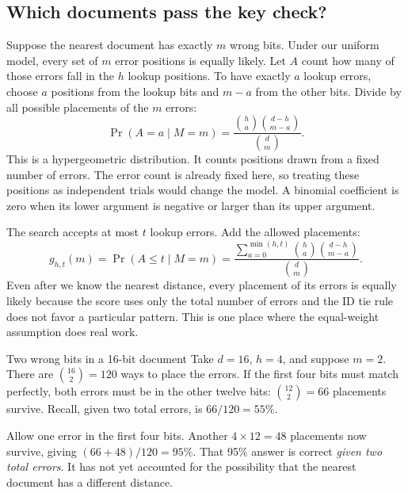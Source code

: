 
\subsection{Which documents pass the key check?}
Suppose the nearest document has exactly $m$ wrong bits. Under our uniform model, every set of
$m$ error positions is equally likely. Let $A$ count how many of those errors fall in the $h$
lookup positions. To have exactly $a$ lookup errors, choose $a$ positions from the lookup bits
and $m-a$ from the other bits. Divide by all possible placements of the $m$ errors:
\begin{equation}
\Pr(A=a\mid M=m)=
\frac{\binom{h}{a}\binom{d-h}{m-a}}{\binom{d}{m}}.
\label{eq:prefix-error-placements}
\end{equation}
This is a hypergeometric distribution. It counts positions drawn from a fixed number of errors.
The error count is already fixed here, so treating these positions as independent trials
would change the model. A binomial coefficient is zero when its lower argument is negative or
larger than its upper argument.

The search accepts at most $t$ lookup errors. Add the allowed placements:
\begin{equation}
g_{h,t}(m)=\Pr(A\le t\mid M=m)
=\frac{\displaystyle\sum_{a=0}^{\min(h,t)}
          \binom{h}{a}\binom{d-h}{m-a}}{\binom{d}{m}}.
\label{eq:prefix-survival}
\end{equation}
Even after we know the nearest distance, every placement of its errors is equally likely because the score
uses only the total number of errors and the ID tie rule does not favor a particular pattern.
This is one place where the equal-weight assumption does real work.

\begin{examplebox}{Two wrong bits in a 16-bit document}
Take $d=16$, $h=4$, and suppose $m=2$. There are $\binom{16}{2}=120$ ways to place the errors.
If the first four bits must match perfectly, both errors must be in the other twelve bits:
$\binom{12}{2}=66$ placements survive. Recall, given two total errors, is $66/120=55\%$.

Allow one error in the first four bits. Another $4\times12=48$ placements now survive, giving
$(66+48)/120=95\%$. That 95\% answer is correct \emph{given two total errors}. It has not yet
accounted for the possibility that the nearest document has a different distance.
\end{examplebox}

